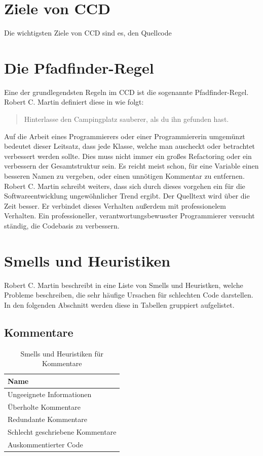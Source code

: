\section{Ziele von CCD}
\SuperPar Die wichtigsten Ziele von CCD sind es, den Quellcode 

\section{Die Pfadfinder-Regel}
\SuperPar Eine der grundlegendsten Regeln im CCD ist die sogenannte Pfadfinder-Regel. Robert C. Martin definiert diese in \cite{CleanCode} wie folgt:

\begin{quote}
	Hinterlasse den Campingplatz sauberer, als du ihn gefunden hast.
\end{quote}

\SuperPar Auf die Arbeit eines Programmierers oder einer Programmiererin umgemünzt bedeutet dieser Leitsatz, dass jede Klasse, welche man auscheckt oder betrachtet verbessert werden sollte. Dies muss nicht immer ein großes Refactoring oder ein verbessern der Gesamtstruktur sein. Es reicht meist schon, für eine Variable einen besseren Namen zu vergeben, oder einen unnötigen Kommentar zu entfernen. Robert C. Martin schreibt weiters, dass sich durch dieses vorgehen ein für die Softwareentwicklung ungewöhnlicher Trend ergibt. Der Quelltext wird über die Zeit besser. Er verbindet dieses Verhalten außerdem mit professionelem Verhalten. Ein professioneller, verantwortungsbewusster Programmierer versucht ständig, die Codebasis zu verbessern.

\section{Smells und Heuristiken}
\SuperPar Robert C. Martin beschreibt in \cite{CleanCode} eine Liste von Smells und Heuristken, welche Probleme beschreiben, die sehr häufige Ursachen für schlechten Code darstellen. In den folgenden Abschnitt werden diese in Tabellen gruppiert aufgelistet. 

\subsection{Kommentare}

\begin{table}[h]
	\centering
		 \begin{tabular}{ | l | }
		 \hline
			Name \\  \hline
			Ungeeignete Informationen\\
			Überholte Kommentare  \\
			Redundante Kommentare \\
			Schlecht geschriebene Kommentare  \\
			Auskommentierter Code \\ \hline
		\end{tabular}
	\caption{Smells und Heuristiken für Kommentare}
	\label{tab:SmellsUndHeuristiken_Comments}
\end{table}

